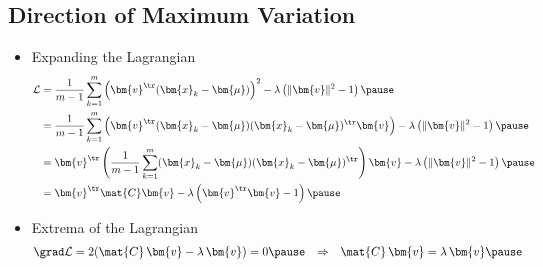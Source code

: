 \begin{slide}
\section[-2]{Direction of Maximum Variation}

\begin{PauseHighLight}
  \begin{itemize}
  \item Expanding the Lagrangian
    \begin{align*}
      \mathcal{L} &= \frac{1}{m-1} \sum_{k=1}^m \left( \bm{v}^\tr
      (\bm{x}_k-\bm{\mu}) \right)^2 - \lambda
      \left(\|\bm{v}\|^2-1\right)\pause
      \\
      &=  \frac{1}{m-1} \sum_{k=1}^m \left( \bm{v}^\tr (\bm{x}_k-\bm{\mu})
        (\bm{x}_k-\bm{\mu})^\tr \bm{v} \right) - \lambda
      \left(\|\bm{v}\|^2-1\right)\pause
      \\
      &= \bm{v}^\tr \left( \frac{1}{m-1} \sum_{k=1}^m   (\bm{x}_k-\bm{\mu})
        (\bm{x}_k-\bm{\mu})^\tr \right) \bm{v} - \lambda
      \left(\|\bm{v}\|^2-1\right)\pause
      \\
      &= \bm{v}^\tr \mat{C} \bm{v} -  \lambda
      \left(\bm{v}^\tr \bm{v}-1\right)\pause
    \end{align*}
  \item Extrema of the Lagrangian
    \begin{align*}
      \grad \mathcal{L} &= 2(\mat{C}\,\bm{v} - \lambda\,\bm{v}) =
      0\pause
      &\Rightarrow& & \mat{C}\,\bm{v} &= \lambda\,\bm{v}\pause
    \end{align*}
  \end{itemize}
\end{PauseHighLight}

\end{slide}


